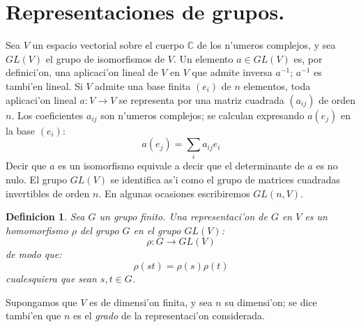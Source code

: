\documentclass[a4paper,openright,12pt]{report}
\numberwithin{equation}{section} %
\newtheorem{definicion}{Definicion}[section] %
\begin{document}
\section{Representaciones de grupos.}
Sea $V$ un espacio vectorial sobre el cuerpo $\mathbb{C}$ de los n'umeros complejos, y sea $GL(V)$ el grupo de isomorfismos de $V$. Un elemento $a \in GL(V)$ es, por definici'on, una aplicaci'on lineal de $V$ en $V$ que admite inversa $a^{-1}$; $a^{-1}$ es tambi'en lineal. Si $V$ admite una base finita $(e_{i})$ de $n$ elementos, toda aplicaci'on lineal $a:V \rightarrow V$ se representa por una matriz cuadrada $(a_{ij})$ de orden $n$. Los coeficientes $a_{ij}$ son n'umeros complejos; se calculan expresando $a(e_{j})$ en la base $(e_{i})$:
\[
a(e_{j})=\sum_{i} a_{ij}e_{i}
\]
Decir que $a$ es un isomorfismo equivale a decir que el determinante de $a$ es no nulo. El grupo $GL(V)$ se identifica as'i como el grupo de matrices cuadradas invertibles de orden $n$. En algunas ocasiones escribiremos $GL(n,V)$.
\begin{definicion}
Sea $G$ un grupo finito. Una representaci'on de $G$ en $V$ es un homomorfismo $\rho$ del grupo $G$ en el grupo $GL(V)$:
\[
\rho : G \rightarrow GL(V)
\]
de modo que:
\[
\rho (st)=\rho (s)  \rho (t)
\]
cualesquiera que sean $s,t \in G$.
\end{definicion}
Supongamos que $V$ es de dimensi'on finita, y sea $n$ su dimensi'on; se dice tambi'en que $n$ es el \textit{grado} de la representaci'on considerada.
\end{document}
